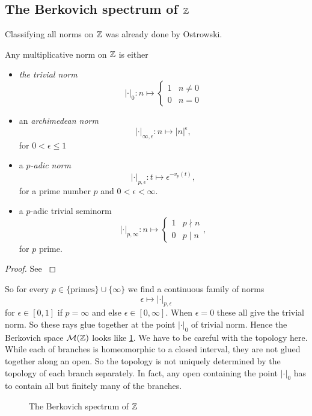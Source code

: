 \subsection{The Berkovich spectrum of $\mathbb{Z}$} \label{sec:the_berkovich_spectrum_of_z}
Classifying all norms on $\mathbb{Z}$ was already done by Ostrowski.
\begin{theorem}[Ostrowski]\label{thm:ostrowksi}
	Any multiplicative norm on $\mathbb{Z}$ is either
	\begin{itemize}
		\item \emph{the trivial norm} \[
				|\cdot |_0: n \mapsto \begin{cases}
					1 & n \ne 0 \\
					0 & n = 0
				\end{cases}
			\]
		\item an \emph{archimedean norm} \[
				|\cdot |_{\infty, \epsilon}: n \mapsto |n|^{\epsilon},
			\]
			for $0 <  \epsilon \le 1$
		\item a \emph{$p$-adic norm} \[
				|\cdot |_{p, \epsilon}: t \mapsto \epsilon ^{- v_p(t)},
			\]
			for a prime number $p$ and $0 < \epsilon < \infty$. 
		\item a $p$-adic trivial seminorm 
			\[
			|\cdot |_{p, \infty}: n \mapsto \begin{cases}
				1 & p \nmid n \\
				0 & p \mid n
			\end{cases}
			,\] 
			for $p$ prime. 
	\end{itemize}
\end{theorem}
\begin{proof}
	See \cite[thm.\ 1, p.\ 3]{koblitzPadicNumbersPadic1984}
\end{proof}
So for every $p \in \{\text{primes}\} \cup \{\infty\} $ we find a continuous family of norms \[
	\epsilon \mapsto|\cdot |_{p, \epsilon}
\] 
for $\epsilon \in [0, 1]$ if $p = \infty$ and else $\epsilon \in [0, \infty]$. 
When $\epsilon = 0$ these all give the trivial norm. 
So these rays glue together at the point $|\cdot |_0$ of trivial norm.
Hence the Berkovich space $\mathcal{M} (\mathbb{Z})$ looks like \cref{fig:berkovich-space-of-z}.
We have to be careful with the topology here.
While each of branches is homeomorphic to a closed interval, they are not glued together along an open.
So the topology is not uniquely determined by the topology of each branch separately.
In fact, any open containing the point $|\cdot |_0$ has to contain all but finitely many of the branches.

\begin{figure}[h]
    \centering
    \caption{The Berkovich spectrum of $\mathbb{Z}$}
    \label{fig:berkovich-space-of-z}
\end{figure}


